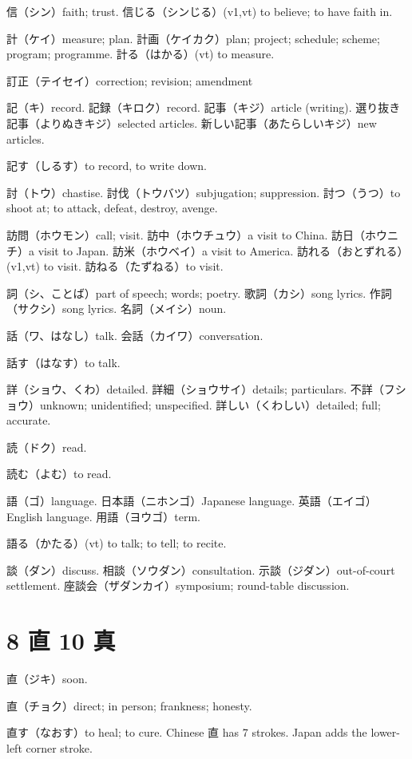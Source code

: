 信（シン）faith; trust.
信じる（シンじる）(v1,vt) to believe; to have faith in.

計（ケイ）measure; plan.
計画（ケイカク）plan; project; schedule; scheme; program; programme.
計る（はかる）(vt) to measure.

訂正（テイセイ）correction; revision; amendment

記（キ）record.
記録（キロク）record.
記事（キジ）article (writing).
選り抜き記事（よりぬきキジ）selected articles.
新しい記事（あたらしいキジ）new articles.

記す（しるす）to record, to write down.

討（トウ）chastise.
討伐（トウバツ）subjugation; suppression.
討つ（うつ）to shoot at; to attack, defeat, destroy, avenge.

訪問（ホウモン）call; visit.
訪中（ホウチュウ）a visit to China.
訪日（ホウニチ）a visit to Japan.
訪米（ホウベイ）a visit to America.
訪れる（おとずれる）(v1,vt) to visit.
訪ねる（たずねる）to visit.

詞（シ、ことば）part of speech; words; poetry.
歌詞（カシ）song lyrics.
作詞（サクシ）song lyrics.
名詞（メイシ）noun.

話（ワ、はなし）talk.
会話（カイワ）conversation.

話す（はなす）to talk.

詳（ショウ、くわ）detailed.
詳細（ショウサイ）details; particulars.
不詳（フショウ）unknown; unidentified; unspecified.
詳しい（くわしい）detailed; full; accurate.

読（ドク）read.

読む（よむ）to read.

語（ゴ）language.
日本語（ニホンゴ）Japanese language.
英語（エイゴ）English language.
用語（ヨウゴ）term.

語る（かたる）(vt) to talk; to tell; to recite.

談（ダン）discuss.
相談（ソウダン）consultation.
示談（ジダン）out-of-court settlement.
座談会（ザダンカイ）symposium; round-table discussion.

\section{8 直 10 真}

直（ジキ）soon.

直（チョク）direct; in person; frankness; honesty.

直す（なおす）to heal; to cure.
Chinese 直 has 7 strokes.
Japan adds the lower-left corner stroke.

